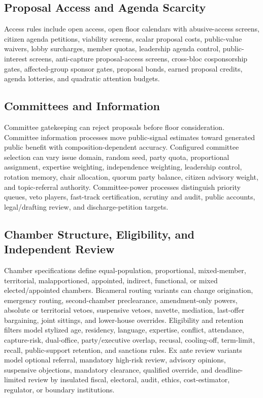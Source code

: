 \documentclass[manuscript]{acmart}
\begin{document}
\subsection{Proposal Access and Agenda Scarcity}

Access rules include open access, open floor calendars with abusive-access screens, citizen agenda petitions, viability screens, scalar proposal costs, public-value waivers, lobby surcharges, member quotas, leadership agenda control, public-interest screens, anti-capture proposal-access screens, cross-bloc cosponsorship gates, affected-group sponsor gates, proposal bonds, earned proposal credits, agenda lotteries, and quadratic attention budgets.

\subsection{Committees and Information}

Committee gatekeeping can reject proposals before floor consideration. Committee information processes move public-signal estimates toward generated public benefit with composition-dependent accuracy. Configured committee selection can vary issue domain, random seed, party quota, proportional assignment, expertise weighting, independence weighting, leadership control, rotation memory, chair allocation, quorum party balance, citizen advisory weight, and topic-referral authority. Committee-power processes distinguish priority queues, veto players, fast-track certification, scrutiny and audit, public accounts, legal/drafting review, and discharge-petition targets.

\subsection{Chamber Structure, Eligibility, and Independent Review}

Chamber specifications define equal-population, proportional, mixed-member, territorial, malapportioned, appointed, indirect, functional, or mixed elected/appointed chambers. Bicameral routing variants can change origination, emergency routing, second-chamber preclearance, amendment-only powers, absolute or territorial vetoes, suspensive vetoes, navette, mediation, last-offer bargaining, joint sittings, and lower-house overrides. Eligibility and retention filters model stylized age, residency, language, expertise, conflict, attendance, capture-risk, dual-office, party/executive overlap, recusal, cooling-off, term-limit, recall, public-support retention, and sanctions rules. Ex ante review variants model optional referral, mandatory high-risk review, advisory opinions, suspensive objections, mandatory clearance, qualified override, and deadline-limited review by insulated fiscal, electoral, audit, ethics, cost-estimator, regulator, or boundary institutions.
\end{document}
